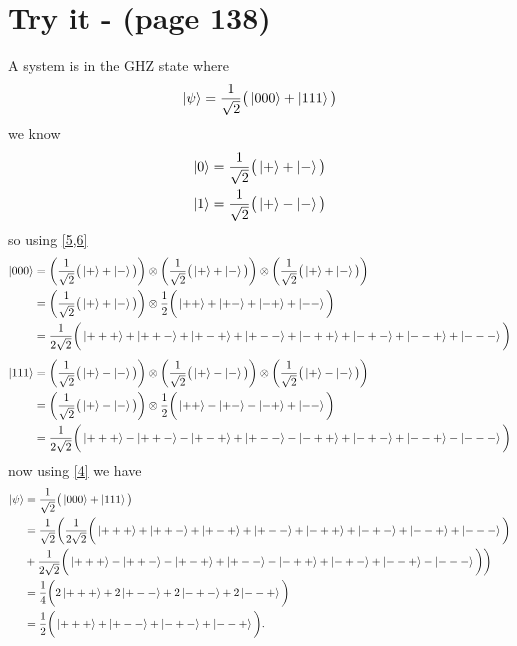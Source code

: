 \documentclass{article}
\begin{document}
\section*{Try it - (page 138)}
A system is in the GHZ state where
\begin{align}
   \ket{\psi} = \frac{1}{\sqrt{2}}\big(\ket{000}+\ket{111}\big)
   \label{4}
\end{align}
we know
\begin{align}
   \ket{0} &= \frac{1}{\sqrt{2}}\big(\ket{+}+\ket{-}\big) \label{5}\\
   \ket{1} &= \frac{1}{\sqrt{2}}\big(\ket{+}-\ket{-}\big) \label{6}
\end{align}
so using \cref{5,6}
\begin{align*}
   \ket{000} &= \bigg(\frac{1}{\sqrt{2}}\big(\ket{+}+\ket{-}\big)\bigg)\otimes\bigg(\frac{1}{\sqrt{2}}\big(\ket{+}+\ket{-}\big)\bigg)\otimes\bigg(\frac{1}{\sqrt{2}}\big(\ket{+}+\ket{-}\big)\bigg)\\
   &= \bigg(\frac{1}{\sqrt{2}}\big(\ket{+}+\ket{-}\big)\bigg)\otimes
   \frac{1}{2}\bigg(\ket{++}+\ket{+-}+\ket{-+}+\ket{--}\bigg) \\
   &= \frac{1}{2\sqrt{2}}\bigg(\ket{+++}+\ket{++-}+\ket{+-+}+\ket{+--}+\ket{-++}+\ket{-+-}+\ket{--+}+\ket{---}\bigg)
\end{align*}
\begin{align*}
   \ket{111} &= \bigg(\frac{1}{\sqrt{2}}\big(\ket{+}-\ket{-}\big)\bigg)\otimes\bigg(\frac{1}{\sqrt{2}}\big(\ket{+}-\ket{-}\big)\bigg)\otimes\bigg(\frac{1}{\sqrt{2}}\big(\ket{+}-\ket{-}\big)\bigg)\\
   &= \bigg(\frac{1}{\sqrt{2}}\big(\ket{+}-\ket{-}\big)\bigg)\otimes
   \frac{1}{2}\bigg(\ket{++}-\ket{+-}-\ket{-+}+\ket{--}\bigg) \\
   &= \frac{1}{2\sqrt{2}}\bigg(\ket{+++}-\ket{++-}-\ket{+-+}+\ket{+--}-\ket{-++}+\ket{-+-}+\ket{--+}-\ket{---}\bigg)
\end{align*}
now using \cref{4} we have
\begin{align*}
   \ket{\psi} &= \frac{1}{\sqrt{2}}\big(\ket{000}+\ket{111}\big)\\
   &= \frac{1}{\sqrt{2}}\bigg(\frac{1}{2\sqrt{2}}\bigg(\ket{+++}+\ket{++-}+\ket{+-+}+\ket{+--}+\ket{-++}+\ket{-+-}+\ket{--+}+\ket{---}\bigg) \\
   &+ \frac{1}{2\sqrt{2}}\bigg(\ket{+++}-\ket{++-}-\ket{+-+}+\ket{+--}-\ket{-++}+\ket{-+-}+\ket{--+}-\ket{---}\bigg)\bigg) \\
   &= \frac{1}{4}\bigg(2\ket{+++}+2\ket{+--}+2\ket{-+-}+2\ket{--+}\bigg) \\
   &= \frac{1}{2}\bigg(\ket{+++}+\ket{+--}+\ket{-+-}+\ket{--+}\bigg).
\end{align*}
\end{document}
